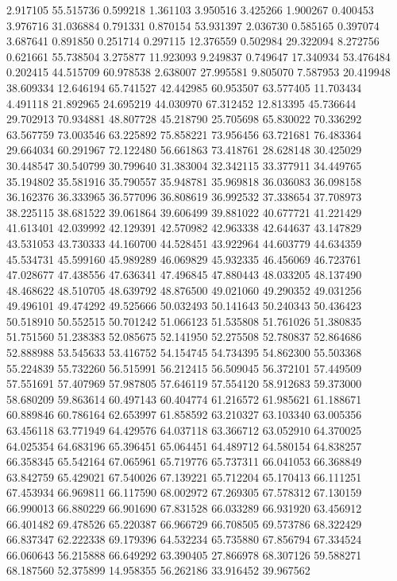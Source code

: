 2.917105
55.515736
0.599218
1.361103
3.950516
3.425266
1.900267
0.400453
3.976716
31.036884
0.791331
0.870154
53.931397
2.036730
0.585165
0.397074
3.687641
0.891850
0.251714
0.297115
12.376559
0.502984
29.322094
8.272756
0.621661
55.738504
3.275877
11.923093
9.249837
0.749647
17.340934
53.476484
0.202415
44.515709
60.978538
2.638007
27.995581
9.805070
7.587953
20.419948
38.609334
12.646194
65.741527
42.442985
60.953507
63.577405
11.703434
4.491118
21.892965
24.695219
44.030970
67.312452
12.813395
45.736644
29.702913
70.934881
48.807728
45.218790
25.705698
65.830022
70.336292
63.567759
73.003546
63.225892
75.858221
73.956456
63.721681
76.483364
29.664034
60.291967
72.122480
56.661863
73.418761
28.628148
30.425029
30.448547
30.540799
30.799640
31.383004
32.342115
33.377911
34.449765
35.194802
35.581916
35.790557
35.948781
35.969818
36.036083
36.098158
36.162376
36.333965
36.577096
36.808619
36.992532
37.338654
37.708973
38.225115
38.681522
39.061864
39.606499
39.881022
40.677721
41.221429
41.613401
42.039992
42.129391
42.570982
42.963338
42.644637
43.147829
43.531053
43.730333
44.160700
44.528451
43.922964
44.603779
44.634359
45.534731
45.599160
45.989289
46.069829
45.932335
46.456069
46.723761
47.028677
47.438556
47.636341
47.496845
47.880443
48.033205
48.137490
48.468622
48.510705
48.639792
48.876500
49.021060
49.290352
49.031256
49.496101
49.474292
49.525666
50.032493
50.141643
50.240343
50.436423
50.518910
50.552515
50.701242
51.066123
51.535808
51.761026
51.380835
51.751560
51.238383
52.085675
52.141950
52.275508
52.780837
52.864686
52.888988
53.545633
53.416752
54.154745
54.734395
54.862300
55.503368
55.224839
55.732260
56.515991
56.212415
56.509045
56.372101
57.449509
57.551691
57.407969
57.987805
57.646119
57.554120
58.912683
59.373000
58.680209
59.863614
60.497143
60.404774
61.216572
61.985621
61.188671
60.889846
60.786164
62.653997
61.858592
63.210327
63.103340
63.005356
63.456118
63.771949
64.429576
64.037118
63.366712
63.052910
64.370025
64.025354
64.683196
65.396451
65.064451
64.489712
64.580154
64.838257
66.358345
65.542164
67.065961
65.719776
65.737311
66.041053
66.368849
63.842759
65.429021
67.540026
67.139221
65.712204
65.170413
66.111251
67.453934
66.969811
66.117590
68.002972
67.269305
67.578312
67.130159
66.990013
66.880229
66.901690
67.831528
66.033289
66.931920
63.456912
66.401482
69.478526
65.220387
66.966729
66.708505
69.573786
68.322429
66.837347
62.222338
69.179396
64.532234
65.735880
67.856794
67.334524
66.060643
56.215888
66.649292
63.390405
27.866978
68.307126
59.588271
68.187560
52.375899
14.958355
56.262186
33.916452
39.967562
